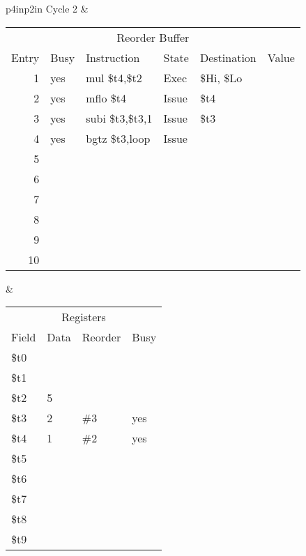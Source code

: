 \noindent
\begin{tabular}{p{4in}p{2in}}
Cycle 2 & \\ \hline \hline

\begin{tabular}{rlp{1in}lll}
\multicolumn{6}{c}{Reorder Buffer} \\
Entry & Busy & Instruction        & State & Destination & Value \\ \hline
 1    & yes  & mul  \$t4,\$t2     & Exec  & \$Hi, \$Lo  &       \\
 2    & yes  & mflo \$t4          & Issue & \$t4        &       \\
 3    & yes  & subi \$t3,\$t3,1   & Issue & \$t3        &       \\
 4    & yes  & bgtz \$t3,loop     & Issue &             &       \\
 5    &      &                    &       &             &       \\
 6    &      &                    &       &             &       \\
 7    &      &                    &       &             &       \\
 8    &      &                    &       &             &       \\
 9    &      &                    &       &             &       \\
10    &      &                    &       &             &       \\
\end{tabular} &

\begin{tabular}{llll}
\multicolumn{4}{c}{Registers} \\
Field & Data & Reorder & Busy \\ \hline
\$t0  &      &         &      \\
\$t1  &      &         &      \\
\$t2  & 5    &         &      \\
\$t3  & 2    & \#3     & yes  \\
\$t4  & 1    & \#2     & yes  \\
\$t5  &      &         &      \\
\$t6  &      &         &      \\
\$t7  &      &         &      \\
\$t8  &      &         &      \\
\$t9  &      &         &      \\
\end{tabular} \\


\end{tabular}

